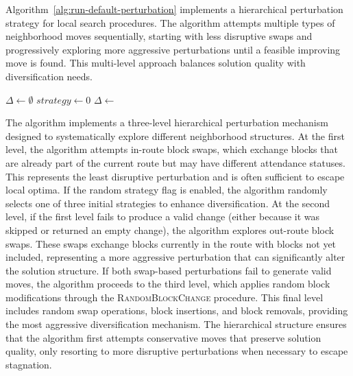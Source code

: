 Algorithm~\ref{alg:run-default-perturbation} implements a hierarchical perturbation strategy for local search procedures. The algorithm attempts multiple types of neighborhood moves sequentially, starting with less disruptive swaps and progressively exploring more aggressive perturbations until a feasible improving move is found. This multi-level approach balances solution quality with diversification needs.

\begin{algorithm}[h!]
	\caption{Local Search Default Perturbation} \label{alg:run-default-perturbation}
	\SetAlgoLined

	$\Delta \leftarrow \emptyset$\;
	$strategy \leftarrow 0$\;
	\If{$\Delta \neq \emptyset$}{
		\Return{$\Delta$}\;
	}
	$\Delta \leftarrow$ \;
	\If{$\Delta \neq \emptyset$}{
		\Return{$\Delta$}\;
	}
	\;
\end{algorithm}

The algorithm implements a three-level hierarchical perturbation mechanism designed to systematically explore different neighborhood structures. At the first level, the algorithm attempts in-route block swaps, which exchange blocks that are already part of the current route but may have different attendance statuses. This represents the least disruptive perturbation and is often sufficient to escape local optima. If the random strategy flag is enabled, the algorithm randomly selects one of three initial strategies to enhance diversification. At the second level, if the first level fails to produce a valid change (either because it was skipped or returned an empty change), the algorithm explores out-route block swaps. These swaps exchange blocks currently in the route with blocks not yet included, representing a more aggressive perturbation that can significantly alter the solution structure. If both swap-based perturbations fail to generate valid moves, the algorithm proceeds to the third level, which applies random block modifications through the \textsc{RandomBlockChange} procedure. This final level includes random swap operations, block insertions, and block removals, providing the most aggressive diversification mechanism. The hierarchical structure ensures that the algorithm first attempts conservative moves that preserve solution quality, only resorting to more disruptive perturbations when necessary to escape stagnation.

